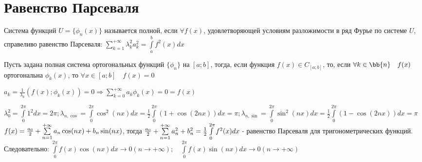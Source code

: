 \section{Равенство Парсеваля}
\begin{Def}
	Система функций $U = \{\phi_n(x)\}$ называется полной, если $\forall f(x)$, удовлетворяющей условиям разложимости в ряд Фурье по системе $U$, справеливо равенство Парсеваля:  $\sum\limits_{k=1}^{+\infty}\lambda_k^2 a_k^2 = \int\limits_{a}^{b}f^2(x)dx$
\end{Def}

\begin{Note}
	Пусть задана полная система ортогональных функций $\{\phi_n\}$ на $[a;b]$, тогда, если функция $f(x) \in C_{[a;b]}$, то, если $\forall k \in \bb{n} \quad f(x)$ ортогональна $\phi_k(x)$, то $\forall x \in [a;b] \quad f(x) = 0$
\end{Note}

\begin{Proof}
	$a_k = \frac{1}{\lambda_k}(f(x);\phi_k(x)) = 0 \Rightarrow \sum\limits_{k=0}^{+\infty}a_k \phi_k(x) = 0 = f(x)$
\end{Proof}

\begin{Example}
	$\lambda_0^2 = \int\limits_{0}^{2\pi}1^2dx = 2\pi; \lambda_{n, \cos} = \int\limits_{0}^{2\pi}\cos^2(nx)dx = \frac{1}{2}\int\limits_{0}^{2\pi}(1+\cos(2nx))dx = \pi; \lambda_{n, \sin} = \int\limits_{0}^{2\pi}\sin^2(nx)dx = \frac{1}{2}\int\limits_{0}^{2\pi}(1-\cos(2nx))dx = \pi$\\
	$f(x) = \frac{a_0}{2} + \sum\limits_{n = 1}^{+\infty}{a_n\cos(nx) + b_n\sin(nx)}$, тогда $\frac{a_0}{2} + \sum\limits_{n = 1}^{+\infty}{a_n^2 + b_n^2} = \frac{1}{2}\int\limits_{0}^{2\pi}f^2(x)dx$ - равенство Парсеваля для тригонометрических функций.\\
	Следовательно: $\int\limits_{0}^{2\pi}f(x)\cos(nx)dx \rightarrow 0 (n \rightarrow +\infty); \quad 
	\int\limits_{0}^{2\pi}f(x)\sin(nx)dx \rightarrow 0 (n \rightarrow +\infty)$
\end{Example}